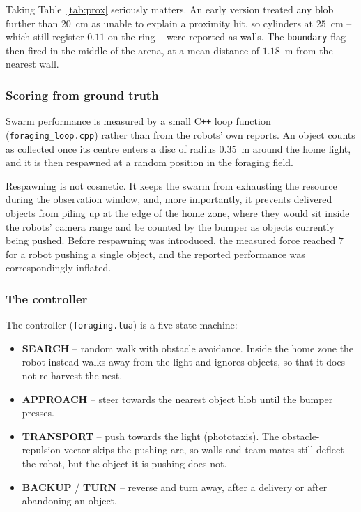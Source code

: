 \documentclass[12pt, a4paper]{article}
\begin{document}
Taking Table~\ref{tab:prox} seriously matters.  An early version treated any
blob further than $20$~cm as unable to explain a proximity hit, so cylinders at
$25$~cm -- which still register $0.11$ on the ring -- were reported as walls.
The \texttt{boundary} flag then fired in the middle of the arena, at a mean
distance of $1.18$~m from the nearest wall.

\subsubsection{Scoring from ground truth}

Swarm performance is measured by a small C\texttt{++} loop function
(\texttt{foraging\_loop.cpp}) rather than from the robots' own reports.  An
object counts as collected once its centre enters a disc of radius $0.35$~m
around the home light, and it is then respawned at a random position in the
foraging field.

Respawning is not cosmetic.  It keeps the swarm from exhausting the resource
during the observation window, and, more importantly, it prevents delivered
objects from piling up at the edge of the home zone, where they would sit inside
the robots' camera range and be counted by the bumper as objects currently being
pushed.  Before respawning was introduced, the measured force reached $7$ for a
robot pushing a single object, and the reported performance was correspondingly
inflated.

\subsubsection{The controller}

The controller (\texttt{foraging.lua}) is a five-state machine:

\begin{itemize}
    \item \textbf{SEARCH} -- random walk with obstacle avoidance.  Inside the
          home zone the robot instead walks away from the light and ignores
          objects, so that it does not re-harvest the nest.
    \item \textbf{APPROACH} -- steer towards the nearest object blob until the
          bumper presses.
    \item \textbf{TRANSPORT} -- push towards the light (phototaxis).  The
          obstacle-repulsion vector skips the pushing arc, so walls and
          team-mates still deflect the robot, but the object it is pushing does
          not.
    \item \textbf{BACKUP} / \textbf{TURN} -- reverse and turn away, after a
          delivery or after abandoning an object.
\end{itemize}
\end{document}
